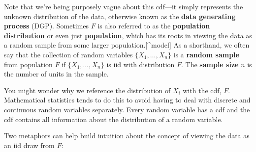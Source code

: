 \documentclass[
  letterpaper,
  DIV=11,
  numbers=noendperiod]{scrreprt}
\theoremstyle{definition}
\theoremstyle{definition}
\theoremstyle{plain}
\theoremstyle{remark}
\begin{document}
Note that we're being purposely vague about this cdf---it simply
represents the unknown distribution of the data, otherwise known as the
\textbf{data generating process} (DGP). Sometimes \(F\) is also referred
to as the \textbf{population distribution} or even just
\textbf{population}, which has its roots in viewing the data as a random
sample from some larger population.{[}\^{}model{]} As a shorthand, we
often say that the collection of random variables
\(\{X_1, \ldots, X_n\}\) is a \textbf{random sample} from population
\(F\) if \(\{X_1, \ldots, X_n\}\) is iid with distribution \(F\). The
\textbf{sample size} \(n\) is the number of units in the sample.

\begin{tcolorbox}[enhanced jigsaw, colbacktitle=quarto-callout-note-color!10!white, breakable, toptitle=1mm, opacityback=0, leftrule=.75mm, rightrule=.15mm, coltitle=black, opacitybacktitle=0.6, toprule=.15mm, arc=.35mm, bottomtitle=1mm, titlerule=0mm, title=\textcolor{quarto-callout-note-color}{\faInfo}\hspace{0.5em}{Note}, colframe=quarto-callout-note-color-frame, bottomrule=.15mm, colback=white, left=2mm]

You might wonder why we reference the distribution of \(X_i\) with the
cdf, \(F\). Mathematical statistics tends to do this to avoid having to
deal with discrete and continuous random variables separately. Every
random variable has a cdf and the cdf contains all information about the
distribution of a random variable.

\end{tcolorbox}

Two metaphors can help build intuition about the concept of viewing the
data as an iid draw from \(F\):
\end{document}
